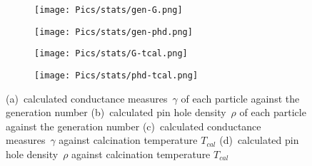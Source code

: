 \begin{figure}[hb]
    \centering
    \begin{subfigure}{.24\textwidth}
        \centering
        \texttt{[image: Pics/stats/gen-G.png]}
        \caption{} \label{fig:emma-G-gen}
    \end{subfigure}
    \begin{subfigure}{.24\textwidth}
        \centering
        \texttt{[image: Pics/stats/gen-phd.png]}
        \caption{} \label{fig:emma-phd-gen}
    \end{subfigure}
    \begin{subfigure}{.24\textwidth}
        \centering
        \texttt{[image: Pics/stats/G-tcal.png]}
        \caption{} \label{fig:g-tcal}
    \end{subfigure}
    \begin{subfigure}{.24\textwidth}
        \centering
        \texttt{[image: Pics/stats/phd-tcal.png]}
        \caption{} \label{fig:phd-tcal}
    \end{subfigure}
	\caption{
		(a)~calculated conductance measures~$\gamma$ of each particle against the generation number %
		(b)~calculated pin hole density~$\rho$ of each particle against the generation number %
		(c)~calculated conductance measures~$\gamma$ against calcination temperature $T_{cal}$
		(d)~calculated pin hole density~$\rho$ against calcination temperature $T_{cal}$
	}

    \label{fig:emma-gen}
\end{figure}

